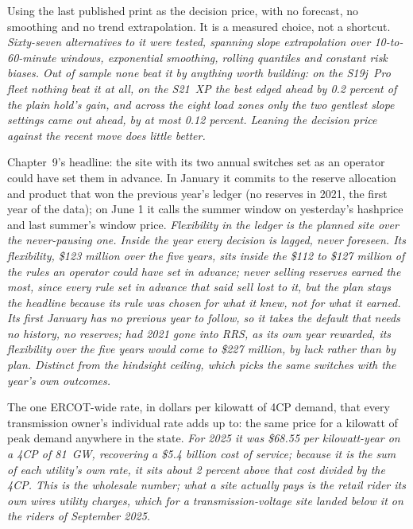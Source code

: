 \begin{description}[leftmargin=0pt,style=unboxed,itemsep=0.35em,parsep=0.15em]
\item[persistence] \hypertarget{glossary:persistence}{}Using the last published print as the decision price, with no forecast, no smoothing and no trend extrapolation. It is a measured choice, not a shortcut. \emph{Sixty-seven alternatives to it were tested, spanning slope extrapolation over 10-to-60-minute windows, exponential smoothing, rolling quantiles and constant risk biases. Out of sample none beat it by anything worth building: on the S19j~Pro fleet nothing beat it at all, on the S21~XP the best edged ahead by 0.2 percent of the plain hold's gain, and across the eight load zones only the two gentlest slope settings came out ahead, by at most 0.12 percent. Leaning the decision price against the recent move does little better.}
\item[planned site] \hypertarget{glossary:planned-site}{}Chapter~9's headline: the site with its two annual switches set as an operator could have set them in advance. In January it commits to the reserve allocation and product that won the previous year's ledger (no reserves in 2021, the first year of the data); on June 1 it calls the summer window on yesterday's hashprice and last summer's window price. \emph{Flexibility in the ledger is the planned site over the never-pausing one. Inside the year every decision is lagged, never foreseen. Its flexibility, \$123 million over the five years, sits inside the \$112 to \$127 million of the rules an operator could have set in advance; never selling reserves earned the most, since every rule set in advance that said sell lost to it, but the plan stays the headline because its rule was chosen for what it knew, not for what it earned. Its first January has no previous year to follow, so it takes the default that needs no history, no reserves; had 2021 gone into RRS, as its own year rewarded, its flexibility over the five years would come to \$227 million, by luck rather than by plan. Distinct from the hindsight ceiling, which picks the same switches with the year's own outcomes.}
\item[postage stamp rate] \hypertarget{glossary:postage-stamp-rate}{}The one ERCOT-wide rate, in dollars per kilowatt of 4CP demand, that every transmission owner's individual rate adds up to: the same price for a kilowatt of peak demand anywhere in the state. \emph{For 2025 it was \$68.55 per kilowatt-year on a 4CP of 81~GW, recovering a \$5.4 billion cost of service; because it is the sum of each utility's own rate, it sits about 2 percent above that cost divided by the 4CP. This is the wholesale number; what a site actually pays is the retail rider its own wires utility charges, which for a transmission-voltage site landed below it on the riders of September 2025.}

\end{description}
